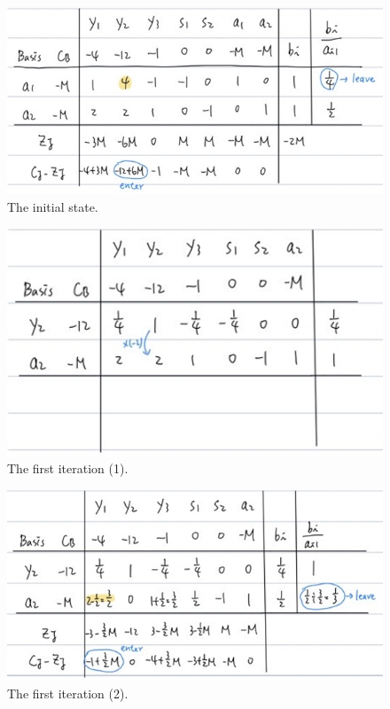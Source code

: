 \documentclass[a4paper,10pt]{article}
\begin{document}
\begin{enumerate}
\begin{enumerate}
{\begin{enumerate}
                \begin{figure}[H]
                    \centering
                    \includegraphics[scale=0.6]{./dual1.png}
                    \caption{The initial state.}
                \end{figure}

                \begin{figure}[H]
                    \centering
                    \includegraphics[scale=0.6]{./dual2.png}
                    \caption{The first iteration (1).}
                \end{figure}

                \begin{figure}[H]
                    \centering
                    \includegraphics[scale=0.6]{./dual3.png}
                    \caption{The first iteration (2).}
                \end{figure}


\end{enumerate}}
\end{enumerate}
\end{enumerate}
\end{document}
